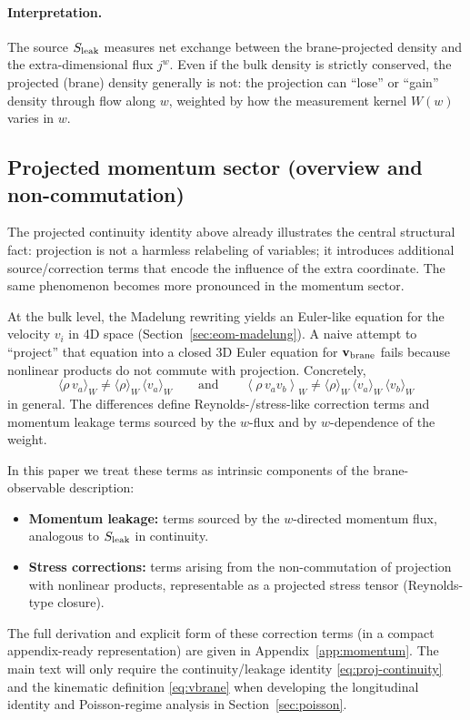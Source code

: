 \documentclass[11pt]{article}
\begin{document}
\paragraph{Interpretation.}
The source $S_{\rm leak}$ measures net exchange between the brane-projected density and the extra-dimensional flux $j^w$. Even if the bulk density is strictly conserved, the projected (brane) density generally is not: the projection can ``lose'' or ``gain'' density through flow along $w$, weighted by how the measurement kernel $W(w)$ varies in $w$.

\subsection{Projected momentum sector (overview and non-commutation)}
\label{sec:projection-momentum}

The projected continuity identity above already illustrates the central structural fact: projection is not a harmless relabeling of variables; it introduces additional source/correction terms that encode the influence of the extra coordinate. The same phenomenon becomes more pronounced in the momentum sector.

At the bulk level, the Madelung rewriting yields an Euler-like equation for the velocity $v_i$ in 4D space (Section~\ref{sec:eom-madelung}). A naive attempt to ``project'' that equation into a closed 3D Euler equation for $\mathbf{v}_{\rm brane}$ fails because nonlinear products do not commute with projection. Concretely,
\begin{equation}
\langle \rho\,v_a\rangle_W \neq \langle \rho\rangle_W \,\langle v_a\rangle_W
\qquad\text{and}\qquad
\left\langle \rho\,v_a v_b\right\rangle_W \neq
\langle \rho\rangle_W\,\langle v_a\rangle_W\,\langle v_b\rangle_W
\end{equation}
in general. The differences define Reynolds-/stress-like correction terms and momentum leakage terms sourced by the $w$-flux and by $w$-dependence of the weight.

In this paper we treat these terms as intrinsic components of the brane-observable description:
\begin{itemize}[leftmargin=2.0em]
\item \textbf{Momentum leakage:} terms sourced by the $w$-directed momentum flux, analogous to $S_{\rm leak}$ in continuity.
\item \textbf{Stress corrections:} terms arising from the non-commutation of projection with nonlinear products, representable as a projected stress tensor (Reynolds-type closure).
\end{itemize}
The full derivation and explicit form of these correction terms (in a compact appendix-ready representation) are given in Appendix~\ref{app:momentum}. The main text will only require the continuity/leakage identity \eqref{eq:proj-continuity} and the kinematic definition \eqref{eq:vbrane} when developing the longitudinal identity and Poisson-regime analysis in Section~\ref{sec:poisson}.
\end{document}
